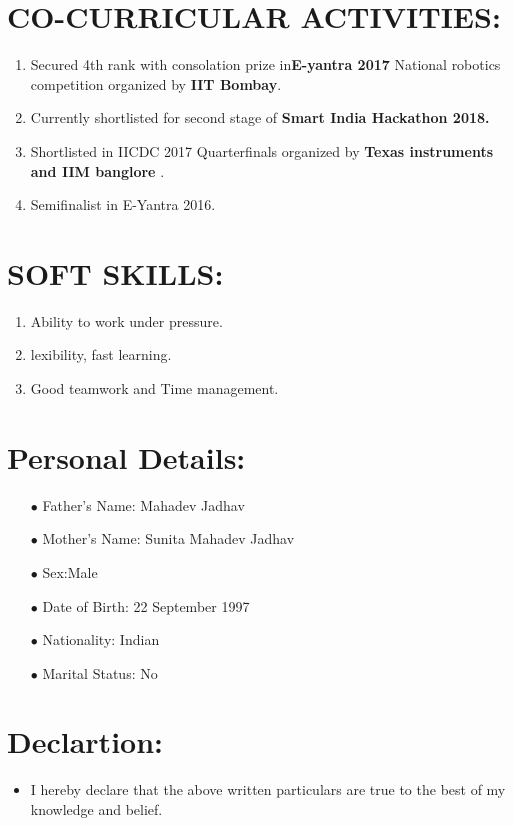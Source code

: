 \documentclass[16pt,a4paper]{article}
\begin{document}
\section{CO-CURRICULAR ACTIVITIES:}
\begin{enumerate}
	\item 	Secured 4th rank with consolation prize in\textbf{E-yantra 2017 }National robotics competition organized by\textbf{ IIT Bombay}.
	\item	Currently shortlisted for second stage of \textbf {Smart India Hackathon 2018.}
	\item	Shortlisted in IICDC 2017 Quarterfinals organized by\textbf{ Texas instruments and IIM banglore} .
	\item	Semifinalist in E-Yantra 2016.	
\end{enumerate}
\section{ SOFT SKILLS:}
\begin{enumerate}
	\item 	Ability to work under pressure.
	\item lexibility, fast learning.
	\item	Good teamwork and Time management.	
\end{enumerate}
\section{Personal Details:}
\begin{itemize}
	\item [$\bullet$]Father's Name: Mahadev Jadhav
	\item [$\bullet$]Mother's Name: Sunita Mahadev Jadhav
	\item [$\bullet$]Sex:Male
	\item [$\bullet$]Date of Birth: 22 September 1997
	\item [$\bullet$]Nationality: Indian
	\item [$\bullet$]Marital Status: No
\end{itemize}
	\section{Declartion:}
\begin{itemize}
	\item  I hereby declare that the above written particulars are true to the best of my knowledge and belief. 
\end{itemize}   

   
\end{document}
